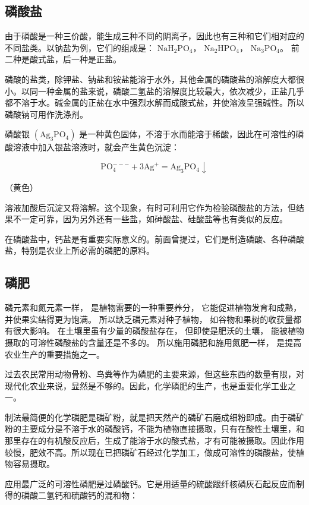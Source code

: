 \subsection{磷酸盐}

由于磷酸是一种三价酸，能生成三种不同的阴离子，因此也有三种和它们相对应的不同盐类。以钠盐为例，它们的组成是：
\(\mathrm{NaH_{2}PO_{4}}\)， \(\mathrm{Na_{2}HPO_{4}}\)，
\(\mathrm{Na_{3}PO_{4}}\)。 前二种是酸式盐，后一种是正盐。

磷酸的盐类，除钾盐、钠盐和铵盐能溶于水外，其他金属的磷酸盐的溶解度大都很小。以同一种金属的盐来说，磷酸二氢盐的溶解度比较最大，依次减少，正盐几乎都不溶于水。碱金属的正盐在水中强烈水解而成酸式盐，并使溶液呈强碱性。所以磷酸钠可用作洗涤剂。

磷酸银 \(\left(\mathrm{Ag}_{3}\mathrm{PO}_{4}\right)\)
是一种黄色固体，不溶于水而能溶于稀酸，因此在可溶性的磷酸溶液中加入银盐溶液时，就会产生黄色沉淀：

\[
\mathrm{PO} _ {4} ^ {- - -} + 3 \mathrm{Ag} ^ {+} = \mathrm{Ag} _ {3} \mathrm{PO} _ {4} \downarrow
\]

（黄色）

溶液加酸后沉淀又将溶解。这个现象，有时可利用它作为检验磷酸盐的方法，但结果不一定可靠，因为另外还有一些盐，如砷酸盐、硅酸盐等也有类似的反应。

在磷酸盐中，钙盐是有重要实际意义的。前面曾提过，它们是制造磷酸、各种磷酸盐，特别是农业上所必需的磷肥的原料。

\subsection{磷肥}

磷元素和氮元素一样， 是植物需要的一种重要养分， 它能促进植物发育和成熟，
并使果实结得更为饱满。 所以缺乏磷元素对种子植物，
如谷物和果树的收获量都有很大影响。 在土壤里虽有少量的磷酸盐存在，
但即使是肥沃的土壤， 能被植物摄取的可溶性磷酸盐的含量还是不多的。
所以施用磷肥和施用氮肥一样， 是提高农业生产的重要措施之一。

过去农民常用动物骨粉、鸟粪等作为磷肥的主要来源，但这些东西的数量有限，对现代化农业来说，显然是不够的。因此，化学磷肥的生产，也是重要化学工业之一。

制法最简便的化学磷肥是磷矿粉，就是把天然产的磷矿石磨成细粉即成。由于磷矿粉的主要成分是不溶于水的磷酸钙，不能为植物直接摄取，只有在酸性土壤里，和那里存在的有机酸反应后，生成了能溶于水的酸式盐，才有可能被摄取。因此作用较慢，肥效不高。所以现在已把磷矿石经过化学加工，做成可溶性的磷酸盐，使植物容易摄取。

应用最广泛的可溶性磷肥是过磷酸钙。它是用适量的硫酸跟纤核磷灰石起反应而制得的磷酸二氢钙和硫酸钙的混和物：

